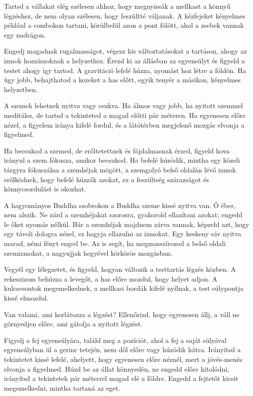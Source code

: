 Tartsd a vállakat elég szélesen ahhoz, hogy megnyissák a mellkast a
könnyű légzéshez, de nem olyan szélesen, hogy feszültté váljanak. A
kézfejeket kényelmes például a combokon tartani, körülbelül azon a pont
fölött, ahol a zsebek vannak egy nadrágon.

Engedj magadnak rugalmasságot, végezz kis változtatásokat a tartáson,
ahogy az izmok hozzászoknak a helyzethez. Érezd ki az állásban az
egyensúlyt és figyeld a testet ahogy így tartod. A gravitáció lefelé
húzza, nyomást hoz létre a földön. Ha úgy jobb, behajthatod a kezeket a
has előtt, egyik tenyér a másikon, kényelmes helyzetben.

A szemek lehetnek nyitva vagy csukva. Ha álmos vagy jobb, ha nyitott
szemmel meditálsz, de tartsd a tekinteted a magad előtti pár méteren. Ha
egyenesen előre nézel, a figyelem iránya kifelé fordul, és a látótérben
megjelenő mozgás elvonja a figyelmed.

Ha becsukod a szemed, de erőltetettnek és fájdalmasnak érzed, figyeld
hova irányul a szem fókusza, amikor becsukod. Ha befelé húzódik, mintha
egy közeli tárgyra fókuszálna a szemhéjak mögött, a szemgolyó belső
oldalán lévő izmok erőlködnek, hogy befelé húzzák azokat, ez a
feszültség szárazságot és könnycsordulást is okozhat.

A hagyományos Buddha szobrokon a Buddha szeme kissé nyitva van. Ő éber,
nem alszik. Ne zárd a szemhéjakat szorosra, gyakorold ellazítani azokat;
engedd le őket nyomás nélkül. Bár a szemhéjak majdnem zárva vannak,
képzeld azt, hogy egy távoli dologra nézel, ez hagyja ellazulni az
izmokat. Egy keskeny sáv nyitva marad, némi fényt enged be. Az is segít,
ha megmasszírozod a belső oldali szemizmokat, a nagyujjak hegyével
körkörös mozgásban.

Vegyél egy lélegzetet, és figyeld, hogyan változik a testtartás légzés
közben. A rekeszizom behúzza a levegőt, a has előre mozdul, hogy helyet
adjon. A kulcscsontok megemelkednek, a mellkasi bordák kifelé nyílnak, a
test súlypontja kissé elmozdul.

Van valami, ami korlátozza a légzést? Ellenőrizd, hogy egyenesen állj, a
váll ne görnyedjen előre, ami gátolja a nyitott légzést.

Figyelj a fej egyensúlyára, találd meg a pozíciót, ahol a fej a saját
súlyával egyensúlyban ül a gerinc tetején, nem dől előre vagy húzódik
hátra. Irányítsd a tekintetet kissé lefelé, ahelyett, hogy egyenesen
előre néznél, mert a jövés-menés elvonja a figyelmed. Húzd be az állat
könnyedén, ne engedd előre kitolódni, irányítsd a tekintetek pár
méterrel magad elé a földre. Engedd a fejtetőt kicsit megemelkedni,
mintha tartaná az eget.

